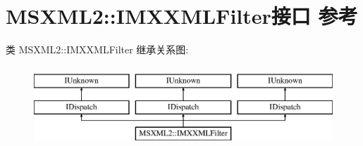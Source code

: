 \hypertarget{interface_m_s_x_m_l2_1_1_i_m_x_x_m_l_filter}{}\section{M\+S\+X\+M\+L2\+:\+:I\+M\+X\+X\+M\+L\+Filter接口 参考}
\label{interface_m_s_x_m_l2_1_1_i_m_x_x_m_l_filter}
类 M\+S\+X\+M\+L2\+:\+:I\+M\+X\+X\+M\+L\+Filter 继承关系图\+:\begin{figure}[H]
\begin{center}
\leavevmode
\includegraphics[height=3.000000cm]{interface_m_s_x_m_l2_1_1_i_m_x_x_m_l_filter}
\end{center}
\end{figure}
